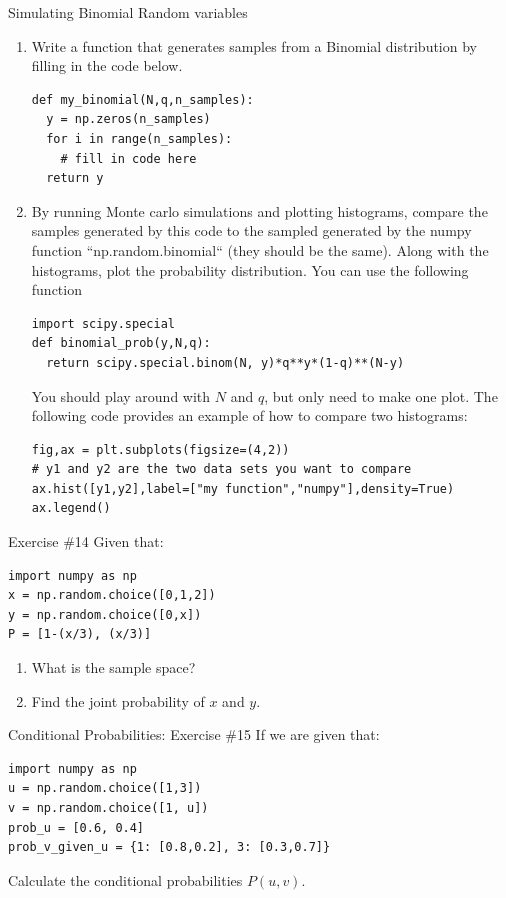 






\begin{exercise}{Simulating Binomial Random variables}
\begin{enumerate}[label=(\alph*)]
\item  Write a function that generates samples from a Binomial distribution by filling in the code below. 
\begin{Verbatim}
def my_binomial(N,q,n_samples):
  y = np.zeros(n_samples)
  for i in range(n_samples):
    # fill in code here
  return y
\end{Verbatim}
\item By running Monte carlo simulations and plotting histograms, compare the samples generated by this code to the sampled generated by the numpy function ``np.random.binomial`` (they should be the same). Along with the histograms, plot the probability distribution. You can use the following function 
\begin{Verbatim}
import scipy.special
def binomial_prob(y,N,q):
  return scipy.special.binom(N, y)*q**y*(1-q)**(N-y)
\end{Verbatim}
You should play around with $N$ and $q$, but only need to make one plot. 
The following code provides an example of how to compare two histograms:

\begin{Verbatim}
fig,ax = plt.subplots(figsize=(4,2))
# y1 and y2 are the two data sets you want to compare
ax.hist([y1,y2],label=["my function","numpy"],density=True)
ax.legend()
\end{Verbatim}
\end{enumerate}


\begin{exercise}{Exercise \#14}
Given that: 
\begin{Verbatim}
import numpy as np
x = np.random.choice([0,1,2])
y = np.random.choice([0,x])
P = [1-(x/3), (x/3)]
\end{Verbatim}
\begin{enumerate}[label=(\alph*)]
\item What is the sample space?
\item Find the joint probability of \(x\) and \(y\).
\end{enumerate}
\end{exercise}

\begin{exercise}{Conditional Probabilities: Exercise \#15}
If we are given that:
\begin{Verbatim}
import numpy as np
u = np.random.choice([1,3])
v = np.random.choice([1, u])
prob_u = [0.6, 0.4]
prob_v_given_u = {1: [0.8,0.2], 3: [0.3,0.7]}
\end{Verbatim}
Calculate the conditional probabilities \(P(u,v)\).
\end{exercise}


\end{exercise}
